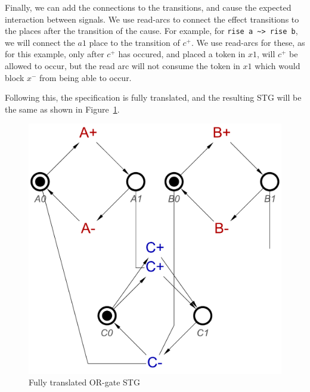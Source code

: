 \documentclass[british,conference,compsoc]{IEEEtran}
\begin{document}
Finally, we can add the connections to the transitions, and cause the 
expected interaction between signals. We use read-arcs to connect the effect
transitions to the places after the transition of the cause. For example, for
\lstinline{rise a ~> rise b}, we will connect the $a1$ place to the 
transition of $c^{+}$. We use read-arcs for these, as for this example, only
after $c^{+}$ has occured, and placed a token in $x1$, will $c^{+}$ be allowed
to occur, but the read arc will not consume the token in $x1$ which would block
$x^{-}$ from being able to occur. 

Following this, the specification is fully translated, and the resulting STG 
will be the same as shown in Figure~\ref{fig:or-gate-stg}.

\begin{figure}[h]
\vspace{-4mm}
\begin{centering}
\includegraphics[scale=0.3]{Images/or-gate-stg}
\par\end{centering}
\protect\caption{\label{fig:or-gate-stg} Fully translated OR-gate STG}
\vspace{-5mm}
\end{figure}
\end{document}
